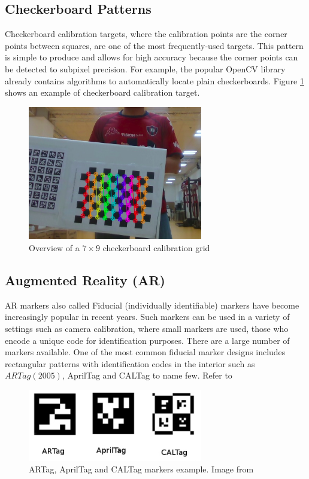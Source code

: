 \subsection{Checkerboard Patterns}

Checkerboard calibration targets, where the calibration points are the corner points between squares, are one of the most frequently-used targets. This pattern is simple to produce and allows for high accuracy because the corner points can be detected to subpixel precision. For example, the popular OpenCV library already contains algorithms to automatically locate plain checkerboards. Figure \ref{fig:target1} shows an example of checkerboard calibration target.


\begin{figure}[!h]
\begin{center}
\includegraphics[width=3in]{figures03/openCV1.png}
\caption{Overview of a $7\times9$ checkerboard calibration grid }%
\label{fig:target1}
\end{center}
\end{figure}

\subsection{Augmented Reality (AR)}
AR markers also called Fiducial (individually identifiable) markers have become increasingly popular in recent years. Such markers can be used in a variety of settings such as camera calibration, where small markers are used, those who encode a unique code for identification purposes. There are a large number of markers available. One of the most common fiducial marker designs includes rectangular patterns with identification codes in the interior such as $ARTag (2005)$, AprilTag and CALTag to name few.  Refer to \cite{fiducialTargets} 


\begin{figure}[!h]
\begin{center}
\includegraphics[width=3in]{figures03/fiducials.png}
\caption{ARTag, AprilTag and CALTag markers example. Image from \cite{fiducialTargets}}
\label{fig:fiducial}
\end{center}
\end{figure}

